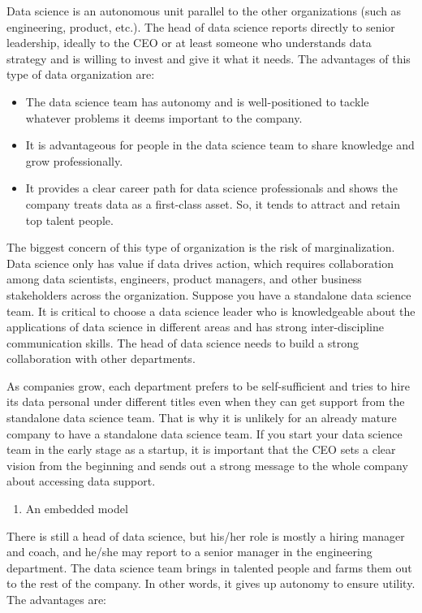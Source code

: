 \documentclass[
  12pt,
]{krantz}
\providecommand{\tightlist}{%
  \setlength{\itemsep}{0pt}\setlength{\parskip}{0pt}}
\begin{document}
Data science is an autonomous unit parallel to the other organizations (such as engineering, product, etc.). The head of data science reports directly to senior leadership, ideally to the CEO or at least someone who understands data strategy and is willing to invest and give it what it needs. The advantages of this type of data organization are:

\begin{itemize}
\tightlist
\item
  The data science team has autonomy and is well-positioned to tackle whatever problems it deems important to the company.
\item
  It is advantageous for people in the data science team to share knowledge and grow professionally.
\item
  It provides a clear career path for data science professionals and shows the company treats data as a first-class asset. So, it tends to attract and retain top talent people.
\end{itemize}

The biggest concern of this type of organization is the risk of marginalization. Data science only has value if data drives action, which requires collaboration among data scientists, engineers, product managers, and other business stakeholders across the organization. Suppose you have a standalone data science team. It is critical to choose a data science leader who is knowledgeable about the applications of data science in different areas and has strong inter-discipline communication skills. The head of data science needs to build a strong collaboration with other departments.

As companies grow, each department prefers to be self-sufficient and tries to hire its data personal under different titles even when they can get support from the standalone data science team. That is why it is unlikely for an already mature company to have a standalone data science team. If you start your data science team in the early stage as a startup, it is important that the CEO sets a clear vision from the beginning and sends out a strong message to the whole company about accessing data support.

\begin{enumerate}
\def\labelenumi{(\arabic{enumi})}
\setcounter{enumi}{1}
\tightlist
\item
  An embedded model
\end{enumerate}

There is still a head of data science, but his/her role is mostly a hiring manager and coach, and he/she may report to a senior manager in the engineering department. The data science team brings in talented people and farms them out to the rest of the company. In other words, it gives up autonomy to ensure utility. The advantages are:
\end{document}
